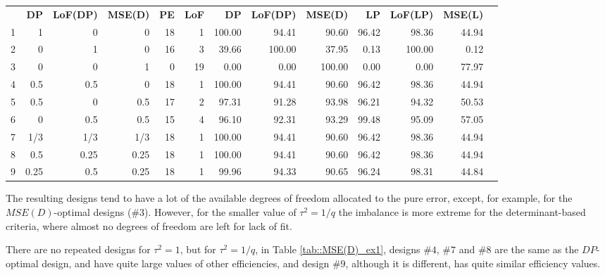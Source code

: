 \begin{table}[h]
{\begin{tabular}{rrrrrrrrrrrrr}
   & \textbf{DP}       & \textbf{LoF(DP)}    & \textbf{MSE(D)}   & \textbf{PE}        & \textbf{LoF}        & \textbf{DP}   & \textbf{LoF(DP)}   & \textbf{MSE(D)}  & \textbf{LP}       & \textbf{LoF(LP)}   & \textbf{MSE(L)}  \\
1 & 1    & 0    & 0    & \multicolumn{1}{|r}{18} & \multicolumn{1}{r|}{1}  & 100.00 & 94.41  & 90.60  & \multicolumn{1}{|r}{96.42} & 98.36  & 44.94 \\
2 & 0    & 1    & 0    & \multicolumn{1}{|r}{16} & \multicolumn{1}{r|}{3}  & 39.66  & 100.00 & 37.95  & \multicolumn{1}{|r}{0.13}  & 100.00 & 0.12  \\
3 & 0    & 0    & 1    & \multicolumn{1}{|r}{0}  & \multicolumn{1}{r|}{19} & 0.00   & 0.00   & 100.00 & \multicolumn{1}{|r}{0.00}  & 0.00   & 77.97 \\
4 & 0.5  & 0.5  & 0    & \multicolumn{1}{|r}{18} & \multicolumn{1}{r|}{1}  & 100.00 & 94.41  & 90.60  & \multicolumn{1}{|r}{96.42} & 98.36  & 44.94 \\
5 & 0.5  & 0    & 0.5  & \multicolumn{1}{|r}{17} & \multicolumn{1}{r|}{2}  & 97.31  & 91.28  & 93.98  & \multicolumn{1}{|r}{96.21} & 94.32  & 50.53 \\
6 & 0    & 0.5  & 0.5  & \multicolumn{1}{|r}{15} & \multicolumn{1}{r|}{4}  & 96.10  & 92.31  & 93.29  & \multicolumn{1}{|r}{99.48} & 95.09  & 57.05 \\
7 & 1/3  & 1/3  & 1/3  & \multicolumn{1}{|r}{18} & \multicolumn{1}{r|}{1}  & 100.00 & 94.41  & 90.60  & \multicolumn{1}{|r}{96.42} & 98.36  & 44.94 \\
8 & 0.5  & 0.25 & 0.25 & \multicolumn{1}{|r}{18} & \multicolumn{1}{r|}{1}  & 100.00 & 94.41  & 90.60  & \multicolumn{1}{|r}{96.42} & 98.36  & 44.94 \\
9 & 0.25 & 0.5  & 0.25 & \multicolumn{1}{|r}{18} & \multicolumn{1}{r|}{1}  & 99.96  & 94.33  & 90.65  & \multicolumn{1}{|r}{96.24} & 98.31  & 44.84 
\end{tabular}
}
\end{table}

The resulting designs tend to have a lot of the available degrees of freedom allocated to the pure error, except, for example, for the $MSE(D)$-optimal designs (\#$3$). However, for the smaller value of $\tau^2=1/q$ the imbalance is more extreme for the determinant-based criteria, where almost no degrees of freedom are left for lack of fit.

There are no repeated designs for $\tau^2=1$, but for $\tau^2=1/q$, in Table \ref{tab::MSE(D)_ex1}, designs \#$4$, \#$7$ and \#$8$ are the same as the $DP$-optimal design, and have quite large values of other efficiencies, and design \#$9$, although it is different, has quite similar efficiency values. 

